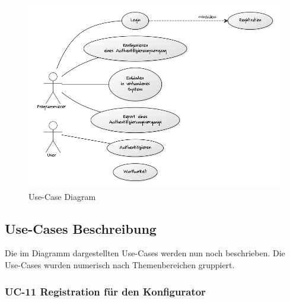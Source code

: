 \begin{figure}[htbp]
\centering
\includegraphics{images/use-case-diagram.png}
\caption{Use-Case Diagram}
\end{figure}

\newpage

\subsection{Use-Cases Beschreibung}\label{use-cases-beschreibung}

Die im Diagramm dargestellten Use-Cases werden nun noch beschrieben. Die
Use-Cases wurden numerisch nach Themenbereichen gruppiert.

\subsubsection{UC-11 Registration für den
Konfigurator}\label{uc-11-registration-fuxfcr-den-konfigurator}


